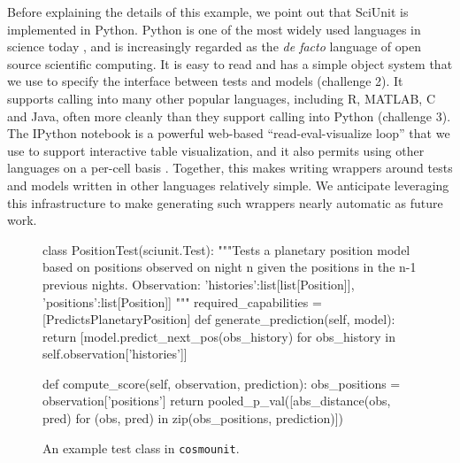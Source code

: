 \documentclass[9pt]{sig-alternate}
\begin{document}
Before explaining the details of this example, we point out that SciUnit is implemented in Python. Python is one of the most widely used languages in science today \cite{sanner1999python}, and is increasingly regarded as the \textit{de facto} language of open source scientific computing. It is easy to read and has a simple object system that we use to specify the interface between tests and models (challenge 2). It supports calling into  many other popular languages, including R, MATLAB, C and Java, often more cleanly than they support calling into Python (challenge 3). The IPython notebook is a powerful web-based ``read-eval-visualize loop'' that we use to support interactive table visualization, and it also permits using other languages on a per-cell basis \cite{ipynb}. Together, this makes writing wrappers around tests and models written in other languages relatively simple. We anticipate leveraging this infrastructure to make generating such wrappers nearly automatic as future work.
\begin{figure}[t]
\small
%
%
\begin{python}
class PositionTest(sciunit.Test):
  """Tests a planetary position model based on positions observed on night n given the positions in the n-1 previous nights.
  Observation: {
      'histories':list[list[Position]], 
      'positions':list[Position]]
  }"""
  required_capabilities = [PredictsPlanetaryPosition]
  def generate_prediction(self, model):
    return [model.predict_next_pos(obs_history)
      for obs_history 
      in self.observation['histories']]

  def compute_score(self, observation, prediction):
    obs_positions = observation['positions']
    return pooled_p_val([abs_distance(obs, pred)
      for (obs, pred) 
      in zip(obs_positions, prediction)])
\end{python}
\vspace{-12px}
\caption{\small An example test class in \texttt{cosmounit}.}
\label{fig:rate_test}
\vspace{-15px}
\end{figure}
\end{document}
